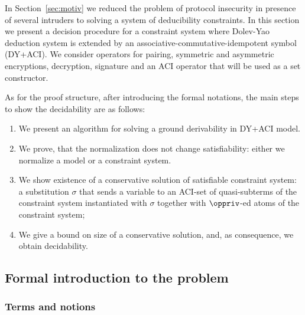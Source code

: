 
In Section~\ref{sec:motiv} we reduced the  problem of protocol  insecurity in presence of several intruders 
to solving  a system of deducibility constraints. 
In this section we present a decision procedure for a constraint system where  
Dolev-Yao deduction system is extended by an associative-commutative-idempotent symbol (DY+ACI).
We consider operators for pairing, symmetric and asymmetric encryptions, decryption, signature 
and an  ACI operator that will be used as a set constructor.


As for the proof structure, after  introducing the formal notations, the main steps to show the decidability are as follows:
\begin{enumerate}
 \item We present an algorithm for solving a ground derivability in DY+ACI model.
 \item We prove, that the normalization does not change satisfiability: either we normalize a model or a constraint system.
 \item We show existence of a conservative solution of satisfiable constraint system: a substitution $\sigma$ that sends a variable to an ACI-set of quasi-subterms of the constraint system instantiated with $\sigma$ 
  together with $\oppriv$-ed atoms of the constraint system;
 \item We give a bound on size of a conservative solution, and, as consequence, we obtain decidability.
\end{enumerate}

\subsection{Formal introduction to the problem}

\subsubsection{Terms and notions}\label{subs:def2}




